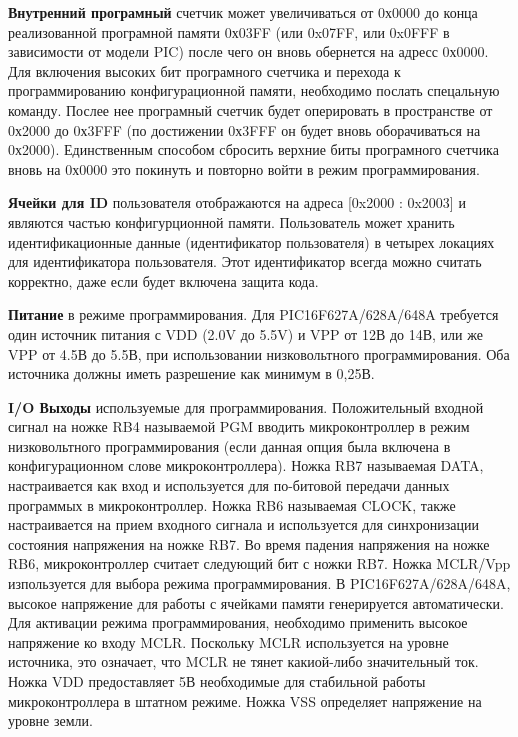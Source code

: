 \textbf{Внутренний програмный}
счетчик может увеличиваться от 0х0000 до 
конца реализованной програмной памяти 0х03FF (или 0x07FF, или 0x0FFF в зависимости от модели PIC)
после чего он вновь обернется на адресс 0х0000.
Для включения высоких бит програмного счетчика и перехода
к программированию конфигурационной памяти, необходимо послать спецальную команду.
Послее нее програмный счетчик будет оперировать в пространстве от 0х2000 до 0х3FFF
(по достижении 0х3FFF он будет вновь оборачиваться на 0х2000). Единственным 
способом сбросить верхние биты програмного счетчика вновь на 0х0000 это покинуть и
повторно войти в режим программирования.

\textbf{Ячейки для ID}
пользователя отображаются на адреса [0x2000 : 0x2003] и являются 
частью конфигурционной памяти. Пользователь может хранить 
идентификационные данные (идентификатор пользователя) в
четырех локациях для идентификатора пользователя. Этот идентификатор всегда можно считать
корректно, даже если будет включена защита кода.

\textbf{Питание}
в режиме программирования. Для PIC16F627A/628A/648A требуется один источник питания с VDD 
(2.0V до 5.5V) и VPP от 12В до 14В, или же VPP от 4.5В до 5.5В, 
при использовании низковольтного программирования. 
Оба источника должны иметь разрешение как минимум в 0,25В.

\textbf{I/O Выходы} используемые для программирования. Положительный входной сигнал на ножке RB4 называемой PGM вводить микроконтроллер в режим низковольтного программирования (если данная опция была включена в конфигурационном слове микроконтроллера). Ножка RB7 называемая DATA, настраивается как вход и используется для по-битовой передачи данных программых в микроконтроллер. Ножка RB6 называемая CLOCK, также настраивается на прием входного сигнала и используется для синхронизации состояния напряжения на ножке RB7. Во время падения напряжения на ножке RB6, микроконтроллер считает следующий бит с ножки RB7. Ножка MCLR/Vpp изпользуется для выбора режима программирования. В PIC16F627A/628A/648A, высокое напряжение для работы с ячейками памяти генерируется автоматически. Для активации
режима программирования, необходимо применить высокое напряжение ко входу MCLR. Поскольку MCLR используется на уровне источника, это означает, что MCLR не тянет какиой-либо значительный ток. Ножка VDD предоставляет 5В необходимые для стабильной работы микроконтроллера в штатном режиме. Ножка VSS определяет напряжение на уровне земли.

